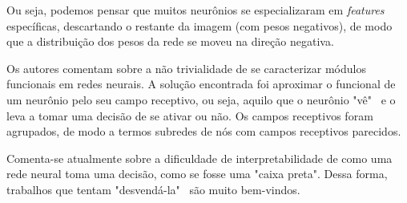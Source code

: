 \documentclass{article}
\begin{document}
        Ou seja, podemos pensar que muitos neurônios se especializaram em \textit{features} específicas, descartando o restante da imagem (com pesos negativos), de modo que a distribuição dos pesos da rede se moveu na direção negativa.

        Os autores comentam sobre a não trivialidade de se caracterizar módulos funcionais em redes neurais.
        A solução encontrada foi aproximar o funcional de um neurônio pelo seu campo receptivo, ou seja, aquilo que o neurônio "vê" \ e o leva a tomar uma decisão de se ativar ou não.
        Os campos receptivos foram agrupados, de modo a termos subredes de nós com campos receptivos parecidos.

        Comenta-se atualmente sobre a dificuldade de interpretabilidade de como uma rede neural toma uma decisão, como se fosse uma "caixa preta".
        Dessa forma, trabalhos que tentam "desvendá-la" \ são muito bem-vindos. 

    
    
\end{document}
